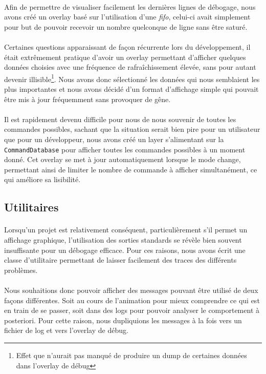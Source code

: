 \paragraph{}
Afin de permettre de visualiser facilement les dernières lignes de débogage,
nous avons créé un overlay basé sur l'utilisation d'une {\em fifo}, celui-ci
avait simplement pour but de pouvoir recevoir un nombre quelconque de ligne
sans être saturé.

\paragraph{}
Certaines questions apparaissant de façon récurrente lors du développement,
il était extrêmement pratique d'avoir un overlay permettant d'afficher
quelques données choisies avec une fréquence de rafraîchissement élevée, sans
pour autant devenir illisible\footnote{Effet que n'aurait pas manqué de
produire un dump de certaines données dans l'overlay de débug}. Nous avons
donc sélectionné les données qui nous semblaient les plus importantes et
nous avons décidé d'un format d'affichage simple qui pouvait être mis à jour
fréquemment sans provoquer de gêne.

\paragraph{}
Il est rapidement devenu difficile pour nous de nous souvenir de toutes les
commandes possibles, sachant que la situation serait bien pire pour un
utilisateur que pour un développeur, nous avons créé un layer s'alimentant
sur la \verb!CommandDatabase! pour afficher toutes les commandes possibles
à un moment donné. Cet overlay se met à jour automatiquement lorsque le mode
change, permettant ainsi de limiter le nombre de commande à afficher
simultanément, ce qui améliore sa lisibilité.


\subsection{Utilitaires}
\paragraph{}
Lorsqu'un projet est relativement conséquent, particulièrement s'il permet un
affichage graphique, l'utilisation des sorties standards se révèle bien
souvent insuffisante pour un débogage efficace. Pour ces raisons, nous avons
écrit une classe d'utilitaire permettant de laisser facilement des traces des
différents problèmes.

\paragraph{}
Nous souhaitions donc pouvoir afficher des messages pouvant être utilisé de
deux façons différentes. Soit au cours de l'animation pour mieux comprendre
ce qui est en train de se passer, soit dans des logs pour pouvoir analyser le
comportement à posteriori. Pour cette raison, nous dupliquions les messages à
la fois vers un fichier de log et vers l'overlay de débug.
